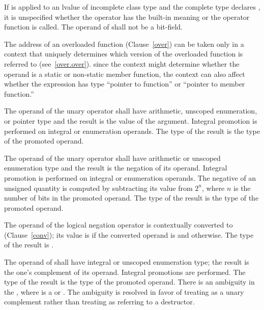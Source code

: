 \pnum
If \tcode{\&} is applied to an lvalue of incomplete class type and the
complete type declares , it is unspecified whether
the operator has the built-in meaning or the operator function is
called. The operand of \tcode{\&} shall not be a bit-field.

\pnum
{}%
The address of an overloaded function (Clause~\ref{over}) can be taken
only in a context that uniquely determines which version of the
overloaded function is referred to (see~\ref{over.over}).
\enternote 
since the context might determine whether the operand is a static or
non-static member function, the context can also affect whether the
expression has type ``pointer to function'' or ``pointer to member
function.''
\exitnote 

\pnum
{}%
The operand of the unary \tcode{+} operator shall have arithmetic, unscoped
enumeration, or pointer type and the result is the value of the
argument. Integral promotion is performed on integral or enumeration
operands. The type of the result is the type of the promoted operand.

\pnum
{}%
The operand of the unary \tcode{-} operator shall have arithmetic or unscoped
enumeration type and the result is the negation of its operand. Integral
promotion is performed on integral or enumeration operands. The negative
of an unsigned quantity is computed by subtracting its value from $2^n$,
where $n$ is the number of bits in the promoted operand. The type of the
result is the type of the promoted operand.

\pnum
{}%
The operand of the logical negation operator \tcode{!} is contextually
converted to 
(Clause~\ref{conv}); its value is 
if the converted operand is  and  otherwise.
The type of the result is .

\pnum
{}%
The operand of \tcode{\~{}} shall have integral or unscoped enumeration type; the
result is the one's complement of its operand. Integral promotions are
performed. The type of the result is the type of the promoted operand.
There is an ambiguity in the 
, where  is a  or .
The
ambiguity is resolved in favor of treating \tcode{\~{}} as a unary
complement rather than treating  as referring to a
destructor.

